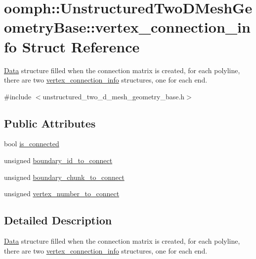 \hypertarget{structoomph_1_1UnstructuredTwoDMeshGeometryBase_1_1vertex__connection__info}{}\section{oomph\+:\+:Unstructured\+Two\+D\+Mesh\+Geometry\+Base\+:\+:vertex\+\_\+connection\+\_\+info Struct Reference}
\label{structoomph_1_1UnstructuredTwoDMeshGeometryBase_1_1vertex__connection__info}


\hyperlink{classoomph_1_1Data}{Data} structure filled when the connection matrix is created, for each polyline, there are two \hyperlink{structoomph_1_1UnstructuredTwoDMeshGeometryBase_1_1vertex__connection__info}{vertex\+\_\+connection\+\_\+info} structures, one for each end.  




{\ttfamily \#include $<$unstructured\+\_\+two\+\_\+d\+\_\+mesh\+\_\+geometry\+\_\+base.\+h$>$}

\subsection*{Public Attributes}
\begin{DoxyCompactItemize}
\item 
bool \hyperlink{structoomph_1_1UnstructuredTwoDMeshGeometryBase_1_1vertex__connection__info_acca1a974e9fcc7af285786c15bc8b099}{is\+\_\+connected}
\item 
unsigned \hyperlink{structoomph_1_1UnstructuredTwoDMeshGeometryBase_1_1vertex__connection__info_a1a8ce060c6d0b91a37b8abf28e260881}{boundary\+\_\+id\+\_\+to\+\_\+connect}
\item 
unsigned \hyperlink{structoomph_1_1UnstructuredTwoDMeshGeometryBase_1_1vertex__connection__info_a3e439a15eb2be8ad07b27a9e02febb55}{boundary\+\_\+chunk\+\_\+to\+\_\+connect}
\item 
unsigned \hyperlink{structoomph_1_1UnstructuredTwoDMeshGeometryBase_1_1vertex__connection__info_aff820bec669c84e87b4f0ec85f8a5174}{vertex\+\_\+number\+\_\+to\+\_\+connect}
\end{DoxyCompactItemize}


\subsection{Detailed Description}
\hyperlink{classoomph_1_1Data}{Data} structure filled when the connection matrix is created, for each polyline, there are two \hyperlink{structoomph_1_1UnstructuredTwoDMeshGeometryBase_1_1vertex__connection__info}{vertex\+\_\+connection\+\_\+info} structures, one for each end. 

